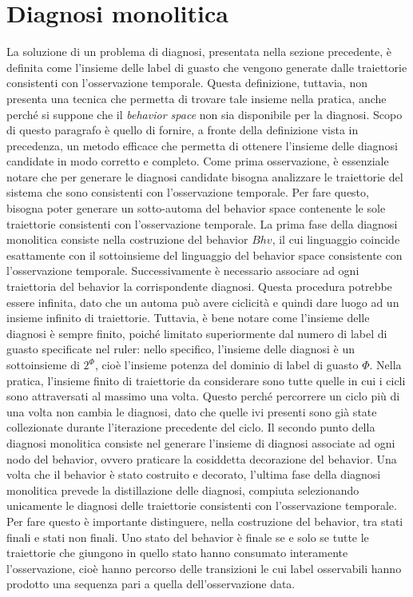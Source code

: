 \section{Diagnosi monolitica}
La soluzione di un problema di  diagnosi, presentata nella sezione precedente, è definita come l'insieme delle label di guasto che vengono generate dalle traiettorie consistenti con l'osservazione temporale. Questa definizione, tuttavia, non presenta una tecnica che permetta di trovare tale insieme nella pratica, anche perché si suppone che il \emph{behavior space} non sia disponibile per la diagnosi. Scopo di questo paragrafo è quello di fornire, a fronte della definizione vista in precedenza, un metodo efficace che permetta di ottenere l'insieme delle diagnosi candidate in modo corretto e completo. 
Come prima osservazione, è essenziale notare che per generare le diagnosi candidate bisogna analizzare le traiettorie del sistema che sono consistenti con l'osservazione temporale. Per fare questo, bisogna poter generare un sotto-automa del behavior space contenente le sole traiettorie consistenti con l'osservazione temporale. 
La prima fase della diagnosi monolitica consiste nella costruzione del behavior $Bhv$, il cui linguaggio coincide esattamente con il sottoinsieme del linguaggio del behavior space consistente con l'osservazione temporale. Successivamente è necessario associare ad ogni traiettoria del behavior la corrispondente diagnosi. Questa procedura potrebbe essere infinita, dato che un automa può avere ciclicità e quindi dare luogo ad un insieme infinito di traiettorie. Tuttavia, è bene notare come l'insieme delle diagnosi è sempre finito, poiché limitato superiormente dal numero di label di guasto specificate nel ruler: nello specifico, l'insieme delle diagnosi è un sottoinsieme di $2^\Phi$, cioè l'insieme potenza del dominio di label di guasto $\Phi$. Nella pratica, l'insieme finito di traiettorie da considerare sono tutte quelle in cui i cicli sono attraversati al massimo una volta. Questo perché percorrere un ciclo più di una volta non cambia le diagnosi, dato che quelle ivi presenti sono già state collezionate durante l'iterazione precedente del ciclo.
Il secondo punto della diagnosi monolitica consiste nel generare l'insieme di diagnosi associate ad ogni nodo del behavior, ovvero praticare la cosiddetta decorazione del behavior.
Una volta che il behavior è stato costruito e decorato, l'ultima fase della diagnosi monolitica prevede la distillazione delle diagnosi, compiuta selezionando unicamente le diagnosi delle traiettorie consistenti con l'osservazione temporale. Per fare questo è importante distinguere, nella costruzione del behavior, tra stati finali e stati non finali. Uno stato del behavior è finale se e solo se tutte le traiettorie che giungono in quello stato hanno consumato interamente l'osservazione, cioè hanno percorso delle transizioni le cui label osservabili hanno prodotto una sequenza pari a quella dell'osservazione data. 

